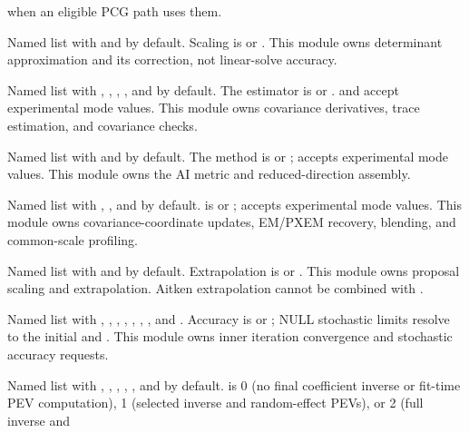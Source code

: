 \documentclass[a4paper]{book}
\begin{document}
\begin{Arguments}
\begin{ldescription}
when an eligible PCG path uses them.
\item[\code{logdet}] Named list with  and
 by default. Scaling is  or
. This module owns determinant approximation and its
correction, not linear-solve accuracy.
\item[\code{score}] Named list with ,
, ,
, and  by default.
The estimator is  or .
 and  accept experimental mode
values. This module owns covariance derivatives, trace estimation, and
covariance checks.
\item[\code{curvature}] Named list with  and
 by default. The method is  or
;  accepts experimental mode values.
This module owns the AI metric and reduced-direction assembly.
\item[\code{update}] Named list with ,
, and  by default.
 is  or ; 
accepts experimental mode values. This module owns covariance-coordinate
updates, EM/PXEM recovery, blending, and common-scale profiling.
\item[\code{proposal}] Named list with  and
 by default. Extrapolation is  or
. This module owns proposal scaling and extrapolation.
Aitken extrapolation cannot be combined with
.
\item[\code{convergence}] Named list with ,
, ,
, ,
, , and
. Accuracy is  or ;
NULL stochastic limits resolve to the initial  and
. This module owns inner iteration convergence and
stochastic accuracy requests.
\item[\code{output}] Named list with , ,
,
, , and
 by default.  is 0 (no final coefficient
inverse or fit-time PEV computation),
1 (selected inverse and random-effect PEVs), or 2 (full inverse and

\end{ldescription}
\end{Arguments}
\end{document}

